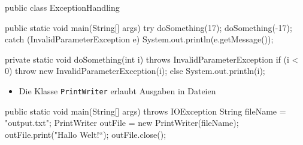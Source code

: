 \documentclass[a4paper,10pt, dvipsnames]{report}
\begin{document}
\begin{javacodebox}
public class ExceptionHandling {

    public static void main(String[] args) {
        try {
            doSomething(17);
            doSomething(-17);
        } catch (InvalidParameterException e) {
            System.out.println(e.getMessage());
        }
    }

    private static void doSomething(int i) throws InvalidParameterException {
        if (i < 0)
            throw new InvalidParameterException(i);
        else
            System.out.println(i);
    }
}
\end{javacodebox}

\begin{itemize}
    \item Die Klasse \texttt{PrintWriter} erlaubt Ausgaben in Dateien
\end{itemize}

\begin{javacodebox}
public static void main(String[] args) throws IOException {
	String fileName = "output.txt";
	PrintWriter outFile = new PrintWriter(fileName);
	outFile.print("Hallo Welt!“);
	outFile.close();
}
\end{javacodebox}


\newpage
{}


\newpage
{}


\newpage
{}


\newpage
{}


\newpage
{}


\newpage
{}


\newpage
{}


\newpage
{}


\newpage
{}

\end{document}
